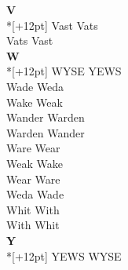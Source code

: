 \vspace{14pt}
\noindent\textbf{\Large V}\\*[+12pt]
Vast Vats\\
Vats Vast\\

\vspace{14pt}
\noindent\textbf{\Large W}\\*[+12pt]
WYSE YEWS\\
Wade Weda\\
Wake Weak\\
Wander Warden\\
Warden Wander\\
Ware Wear\\
Weak Wake\\
Wear Ware\\
Weda Wade\\
Whit With\\
With Whit\\

\vspace{14pt}
\noindent\textbf{\Large Y}\\*[+12pt]
YEWS WYSE\\

